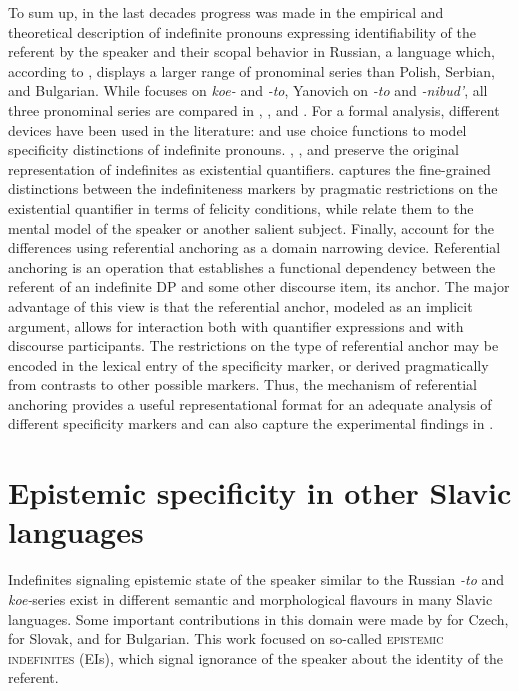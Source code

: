 \documentclass[output=paper,colorlinks,citecolor=brown]{langscibook}
\begin{document}
To sum up, in the last decades progress was made in the empirical and theoretical description of indefinite pronouns expressing identifiability of the referent by the speaker and their scopal behavior in Russian, a language which, according to \citet{Haspelmath1997}, displays a larger range of pronominal series than Polish, Serbian, and Bulgarian. While \citet{Kagan2011} focuses on \textit{koe-} and \textit{-to}, Yanovich on \textit{-to} and \textit{-nibud’}, all three pronominal series are compared in \citet{Geist2008}, \citet{Gorishneva.Zimmermann2011}, and \citet{Onea.Geist2011}. For a formal analysis, different devices have been used in the literature: \citet{Yanovich2005} and \citet{Geist2008} use choice functions to model specificity distinctions of indefinite pronouns. \citet{Kagan2011}, \citet{Gorishneva.Zimmermann2011}, and \citet{Onea.Geist2011} preserve the original representation of indefinites as existential quantifiers. \citet{Kagan2011} captures the fine-grained distinctions between the indefiniteness markers by pragmatic restrictions on the existential quantifier in terms of felicity conditions, while \citet{Gorishneva.Zimmermann2011} relate them to the mental model of the speaker or another salient subject. Finally, \citet{Onea.Geist2011} account for the differences using referential anchoring as a domain narrowing device. Referential anchoring is an operation that establishes a functional dependency between the referent of an indefinite DP and some other discourse item, its anchor. The major advantage of this view is that the referential anchor, modeled as an implicit argument, allows for interaction both with quantifier expressions and with discourse participants. The restrictions on the type of referential anchor may be encoded in the lexical entry of the specificity marker, or derived pragmatically from contrasts to other possible markers. Thus, the mechanism of referential anchoring provides a useful representational format for an adequate analysis of different specificity markers and can also capture the experimental findings in \citet{Marti.Ionin2019}. 

\section{Epistemic specificity in other Slavic languages}\label{geist:sec:4}

Indefinites signaling epistemic state of the speaker similar to the Russian \textit{-to} and \textit{koe-}series exist in different semantic and morphological flavours in many Slavic languages. Some important contributions in this domain were made by \citet{Simik2015} for Czech, \citet{Richtarcikova2015} for Slovak, and \citet{Koev2017} for Bulgarian. This work focused on so-called \textsc{epistemic indefinites} (EIs), which signal ignorance of the speaker about the identity of the referent. 
\end{document}
